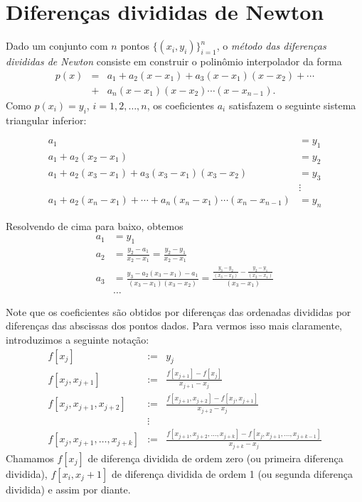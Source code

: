 \section{Diferenças divididas de Newton}
Dado um conjunto com $n$ pontos $\{(x_i, y_i)\}_{i=1}^n$, o \emph{método das diferenças divididas de Newton} consiste em construir o polinômio interpolador da forma
\begin{eqnarray*}
p(x) &=& a_1 + a_2 (x-x_1) + a_3 (x-x_1)(x-x_2) + \cdots \\
     &+& a_n (x-x_1)(x-x_2)\cdots (x-x_{n-1}).
\end{eqnarray*}
Como $p(x_i) = y_i$, $i=1, 2, \dotsc, n$, os coeficientes $a_i$ satisfazem o seguinte sistema triangular inferior:
\begin{small}
  \begin{equation*}
    \begin{array}{ll}
a_1               &= y_1\\
a_1+a_2(x_2-x_1)  &= y_2\\
a_1+a_2(x_3-x_1)+a_3(x_3-x_1)(x_3-x_2) &= y_3\\
&\vdots\\
a_1+a_2(x_n-x_1)+\cdots + a_n(x_n-x_1)\cdots (x_n-x_{n-1}) &= y_n
    \end{array}
  \end{equation*}
\end{small}
Resolvendo de cima para baixo, obtemos
\begin{equation*}\label{eq:coef_dif_div}
  \begin{split}
a_1&=y_1\\
a_2&=\frac{y_2-a_1}{x_2-x_1}=\frac{y_2-y_1}{x_2-x_1}\\
a_3&=\frac{y_3-a_2(x_3-x_1)-a_1}{(x_3-x_1)(x_3-x_2)}=\frac{\frac{y_3-y_2}{(x_3-x_2)}-\frac{y_2-y_1}{(x_2-x_1)}}{(x_3-x_1)}\\
&\ldots
  \end{split}
\end{equation*}

Note que os coeficientes são obtidos por diferenças das ordenadas divididas por diferenças das abscissas dos pontos dados. Para vermos isso mais claramente, introduzimos a seguinte notação:
\begin{eqnarray*}
f[x_j]&:=&y_j\\
f[x_j, x_{j+1}]&:=&\frac{f[x_{j+1}]-f[x_j]}{x_{j+1}-x_j}\\
f[x_j, x_{j+1}, x_{j+2}]&:=&\frac{f[x_{j+1}, x_{j+2}]-f[x_j, x_{j+1}]}{x_{j+2}-x_j}\\
&\vdots&\\
f[x_j, x_{j+1}, \dotsc, x_{j+k}] &:=& \frac{f[x_{j+1}, x_{j+2}, \dotsc, x_{j+k}]-f[x_j, x_{j+1}, \dotsc, x_{j+k-1}]}{x_{j+k}-x_j}
\end{eqnarray*}
Chamamos $f[x_j]$ de diferença dividida de ordem zero (ou primeira diferença dividida), $f[x_i,x_j+1]$ de diferença dividida de ordem 1 (ou segunda diferença dividida) e assim por diante.

